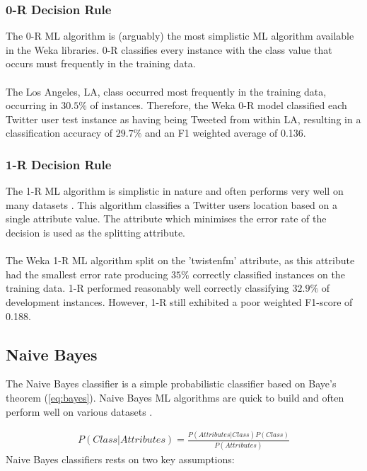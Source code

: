 \documentclass[11pt]{article}
\begin{document}
\subsubsection{0-R Decision Rule}

The 0-R ML algorithm is (arguably) the most simplistic ML algorithm available in the Weka libraries. 0-R classifies every instance with the class value that occurs must frequently in the training data.\\\\
The Los Angeles, LA, class occurred most frequently in the training data, occurring in $30.5\%$ of instances. Therefore, the Weka 0-R model classified each Twitter user test instance as having being Tweeted from within LA, resulting in a classification accuracy of $29.7\%$ and an F1 weighted average of 0.136.    

\subsubsection{1-R Decision Rule}

The 1-R ML algorithm is simplistic in nature and often performs very well on many datasets \cite{holte-1R}. This algorithm classifies a Twitter users location based on a single attribute value. The attribute which minimises the error rate of the decision is used as the splitting attribute.\\\\
The Weka 1-R ML algorithm split on the 'twistenfm' attribute, as this attribute had the smallest error rate producing $35\%$ correctly classified instances on the training data. 1-R performed reasonably well correctly classifying $32.9\%$ of development instances. However, 1-R still exhibited a poor weighted F1-score of 0.188.

\subsection{Naive Bayes}

The Naive Bayes classifier is a simple probabilistic classifier based on Baye's theorem (\ref{eq:bayes}). Naive Bayes ML algorithms are quick to build and often perform well on various datasets \cite{zhang-naive}.

\begin{gather*}
P(Class|Attributes) = \frac{P(Attributes|Class)P(Class)}{P(Attributes)} \tag{1}\label{eq:bayes}
\end{gather*}
Naive Bayes classifiers rests on two key assumptions:
\end{document}
